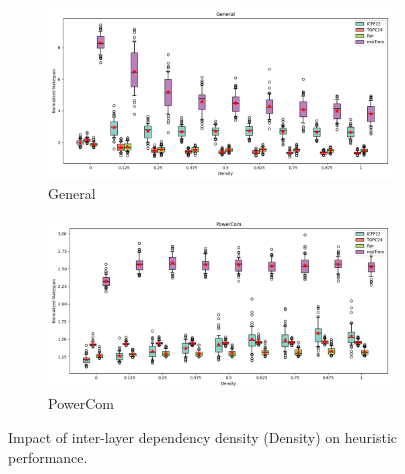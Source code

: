 \documentclass{article}
\begin{document}
\begin{figure}[htbp]
\\[2ex]
\begin{subfigure}[b]{0.32\textwidth}\includegraphics[width=\textwidth]{Results/Density/Density_General_boxplot}\caption{General}\label{fig:boxplot_figures_Density_General}\end{subfigure}
\hfill
\begin{subfigure}[b]{0.32\textwidth}\includegraphics[width=\textwidth]{Results/Density/Density_PowerCom_boxplot}\caption{PowerCom}\label{fig:boxplot_figures_Density_PowerCom}\end{subfigure}
\hfill
\caption{Impact of inter-layer dependency density (Density) on heuristic performance.}
\label{fig:boxplot_figures_Density}
\end{figure}
\end{document}

